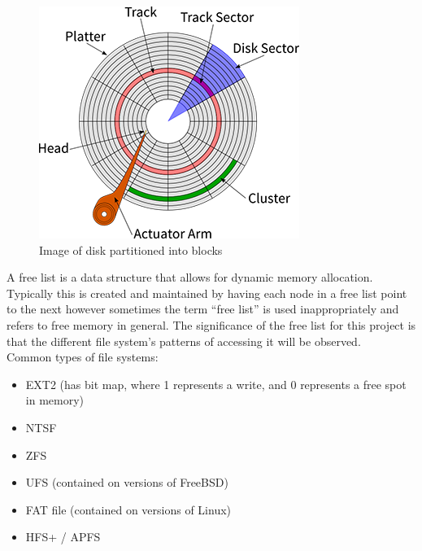 \documentclass[a4paper]{article}
\begin{document}
\begin{figure}[H]
\caption{Image of disk partitioned into blocks}
\includegraphics[scale=0.7]{hard-disk-structure}
\end{figure}

A free list is a data structure that allows for dynamic memory allocation. Typically this is created and maintained by having each node in a free list point to the next however sometimes the term “free list” is used inappropriately and refers to free memory in general. The significance of the free list for this project is that the different file system’s patterns of accessing it will be observed.\\


Common types of file systems:
\begin{itemize}
\item EXT2 (has bit map, where 1 represents a write, and 0 represents a free spot in memory)
\item NTSF
\item ZFS
\item UFS (contained on versions of FreeBSD)
\item FAT file (contained on versions of Linux)
\item HFS+ / APFS 
\end{itemize}
\end{document}
